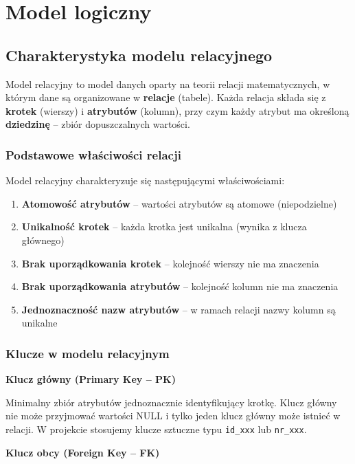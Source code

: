 \documentclass[a4paper,titleauthor]{mwart}
\begin{document}
	\section{Model logiczny}

	\subsection{Charakterystyka modelu relacyjnego}

	Model relacyjny to model danych oparty na teorii relacji matematycznych, w którym dane są organizowane w \textbf{relacje} (tabele). Każda relacja składa się z \textbf{krotek} (wierszy) i \textbf{atrybutów} (kolumn), przy czym każdy atrybut ma określoną \textbf{dziedzinę} -- zbiór dopuszczalnych wartości.

	\subsubsection{Podstawowe właściwości relacji}

	Model relacyjny charakteryzuje się następującymi właściwościami:

	\begin{enumerate}
		\item \textbf{Atomowość atrybutów} -- wartości atrybutów są atomowe (niepodzielne)
		\item \textbf{Unikalność krotek} -- każda krotka jest unikalna (wynika z klucza głównego)
		\item \textbf{Brak uporządkowania krotek} -- kolejność wierszy nie ma znaczenia
		\item \textbf{Brak uporządkowania atrybutów} -- kolejność kolumn nie ma znaczenia
		\item \textbf{Jednoznaczność nazw atrybutów} -- w ramach relacji nazwy kolumn są unikalne
	\end{enumerate}

	\subsubsection{Klucze w modelu relacyjnym}

	\textbf{Klucz główny (Primary Key -- PK)}

	Minimalny zbiór atrybutów jednoznacznie identyfikujący krotkę. Klucz główny nie może przyjmować wartości NULL i tylko jeden klucz główny może istnieć w relacji. W projekcie stosujemy klucze sztuczne typu \texttt{id\_xxx} lub \texttt{nr\_xxx}.

	\textbf{Klucz obcy (Foreign Key -- FK)}
\end{document}
